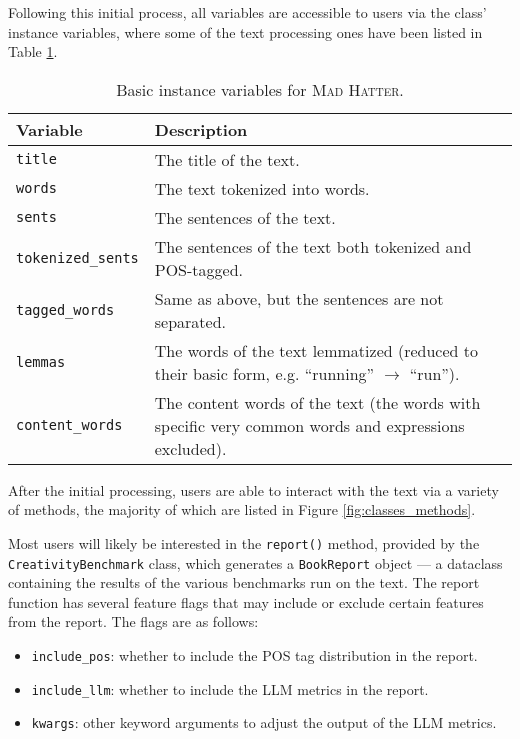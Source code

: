 Following this initial process, all variables are accessible to users via the class' instance variables, where some of the text processing ones have been listed in Table \ref{tab:instance_variables}. 

\begin{table}[htbp]
    \centering
    \begin{tabular}{p{}p{}}
        \toprule
        \textbf{Variable} & \textbf{Description} \\
        \midrule
        \texttt{title} & The title of the text. \\
        \texttt{words} & The text tokenized into words. \\
        \texttt{sents} & The sentences of the text. \\
        \texttt{tokenized\_sents} & The sentences of the text both tokenized and POS-tagged. \\
        \texttt{tagged\_words} & Same as above, but the sentences are not separated. \\
        \texttt{lemmas} & The words of the text lemmatized (reduced to their basic form, e.g. ``running'' $\to$ ``run''). \\
        \texttt{content\_words} & The content words of the text (the words with specific very common words and expressions excluded). \\
        \bottomrule
    \end{tabular}
    \caption{Basic instance variables for \textsc{Mad Hatter}.}\label{tab:instance_variables}
\end{table}

After the initial processing, users are able to interact with the text via a variety of methods, the majority of which are listed in Figure \ref{fig:classes_methods}.

Most users will likely be interested in the \texttt{report()} method, provided by the \texttt{CreativityBenchmark} class, which generates a \texttt{BookReport} object --- a dataclass containing the results of the various benchmarks run on the text. The report function has several feature flags that may include or exclude certain features from the report. The flags are as follows:

\begin{itemize}
    \item \texttt{include\_pos}: whether to include the POS tag distribution in the report.
    \item \texttt{include\_llm}: whether to include the LLM metrics in the report.
    \item \texttt{kwargs}: other keyword arguments to adjust the output of the LLM metrics.
\end{itemize}

